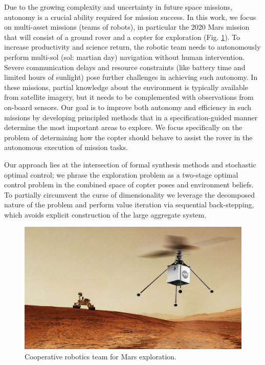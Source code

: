 \documentclass[conference]{IEEEtran}
\begin{document}
Due to the growing complexity and uncertainty in future space missions, autonomy is a crucial ability required for mission success. In this work, we focus on multi-asset missions (teams of robots), in particular the 2020 Mars mission that will consist of a ground rover and a copter for exploration (Fig. \ref{fig:heli-rover}). To increase productivity and science return, the robotic team needs to autonomously perform multi-sol (sol: martian day) navigation without human intervention. Severe communication delays and resource constraints (like battery time and limited hours of sunlight) pose further challenges in achieving such autonomy. In these missions, partial knowledge about the environment is typically available from satellite imagery, but it needs to be complemented with observations from on-board sensors. Our goal is to improve both autonomy and efficiency in such missions by developing principled methods that in a specification-guided manner determine the most important areas to explore. We focus specifically on the problem of determining how the copter should behave to assist the rover in the autonomous execution of mission tasks.

Our approach lies at the intersection of formal synthesis methods and stochastic optimal control; we phrase the exploration problem as a two-stage optimal control problem in the combined space of copter poses and environment beliefs. To partially circumvent the curse of dimensionality we leverage the decomposed nature of the problem and perform value iteration via sequential back-stepping, which avoids explicit construction of the large aggregate system.
\begin{figure}
  \begin{center}
    \includegraphics[width=0.8\columnwidth]{figs/heli-rover.png}
  \end{center}
  \caption{Cooperative robotics team for Mars exploration.}
  \label{fig:heli-rover}
\end{figure}
\end{document}
